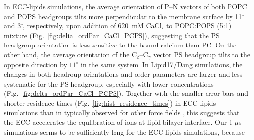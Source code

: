 \documentclass[journal=jpcbfk,manuscript=article]{achemso}
\begin{document}
In ECC-lipids simulations, the average orientation of P--N vectors of both POPC and POPS headgroups tilts more perpendicular to the membrane surface
by 11$^\circ$ and  3$^\circ$, respectively, upon addition of 620~mM CaCl$_2$ to POPC:POPS (5:1) mixture (Fig.~\ref{fig:delta_ordPar_CaCl_PCPS}),
suggesting that the PS headgroup orientation is less sensitive to the bound calcium than PC.
On the other hand, the average orientation of the C$_{\beta}$--C$_{\gamma}$ vector PS headgroup
tilts to the opposite direction by $11^\circ$ in the same system.
In Lipid17/Dang simulations, the changes in both headroup orientations and order parameters
are larger and less systematic for the PS headgroup, especially with lower concentrations (Fig.~\ref{fig:delta_ordPar_CaCl_PCPS}).
Together with the smaller error bars and shorter residence times (Fig.~\ref{fig:hist_residence_times}) in
ECC-lipids simulations than in typically observed for other force fields \cite{javanainen17,melcr18,NMRlipidsIV},
this suggests that the ECC accelerates the equlibration of ions at lipid bilayer interface.
%
%
%
Our 1 $\mu$s simulations seems to be sufficiently long for the ECC-lipids simulations, because
\end{document}
